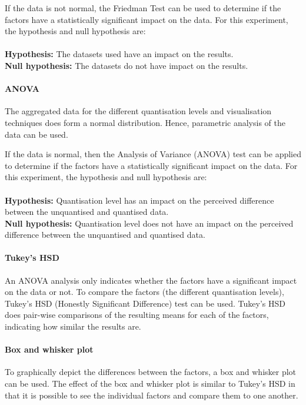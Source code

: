 If the data is not normal, the Friedman Test can be used to determine if the
factors have a statistically significant impact on the data. For this
experiment, the hypothesis and null hypothesis are: \\ \\
\textbf{Hypothesis:} The datasets used have an impact on the results. \\
\textbf{Null hypothesis:} The datasets do not have impact on the results.

\paragraph{ANOVA}
The aggregated data for the different quantisation levels and visualisation
techniques does form a normal distribution. Hence, parametric analysis of
the data can be used.

If the data is normal, then the Analysis of Variance (ANOVA) test can be
applied to determine if the factors have a statistically significant impact on
the data. For this experiment, the hypothesis and null hypothesis are: \\ \\
\textbf{Hypothesis:} Quantisation level has an impact on the perceived
difference between the unquantised and quantised data. \\
\textbf{Null hypothesis:} Quantisation level does not have an impact on the
perceived difference between the unquantised and quantised data.

\paragraph{Tukey's HSD}
An ANOVA analysis only indicates whether the factors have a significant impact
on the data or not. To compare the factors (the different quantisation levels),
Tukey's HSD (Honestly Significant Difference) test can be used. Tukey's HSD
does pair-wise comparisons of the resulting means for each of the factors,
indicating how similar the results are.

\paragraph{Box and whisker plot}
To graphically depict the differences between the factors, a box and whisker
plot can be used. The effect of the box and whisker plot is similar to Tukey's
HSD in that it is possible to see the individual factors and compare them to
one another.

